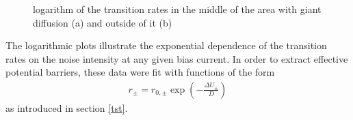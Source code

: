 \documentclass[12pt,a4paper]{article}
\begin{document}
\begin{figure}[H]
	\hspace*{-0.5cm}
	\caption{logarithm of the transition rates in the middle of the area with giant diffusion (a) and outside of it (b)}
	\label{arrhplots}
\end{figure}
The logarithmic plots illustrate the exponential dependence of the transition rates on the noise intensity at any given bias current. In order to extract effective potential barriers, these data were fit with functions of the form
\begin{align*}
r_{\pm}=r_{0,\pm}\exp\left(-\frac{\Delta U_{\pm}}{D}\right)
\end{align*}
as introduced in section \ref{tst}. 



\end{document}

